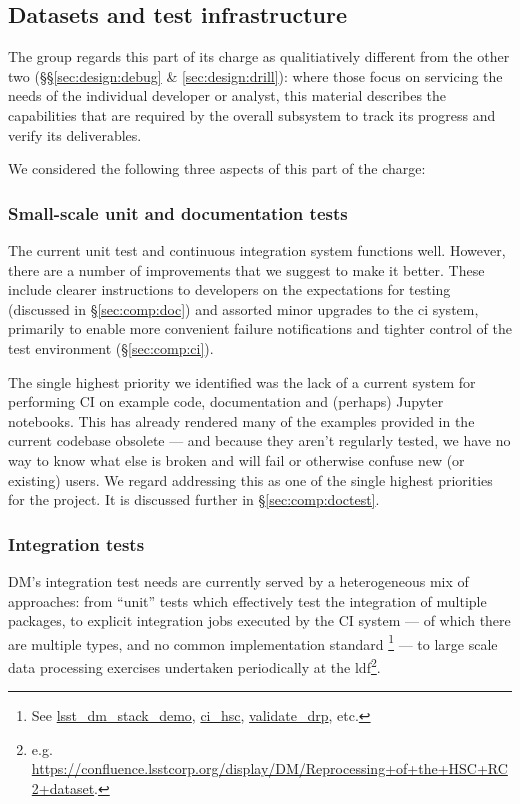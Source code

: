 \subsection{Datasets and test infrastructure}
\label{sec:design:test}

The group regards this part of its charge as qualitiatively different from the
other two (\S\S\ref{sec:design:debug} \& \ref{sec:design:drill}): where those
focus on servicing the needs of the individual developer or analyst, this
material describes the capabilities that are required by the overall subsystem
to track its progress and verify its deliverables.

We considered the following three aspects of this part of the charge:

\subsubsection{Small-scale unit and documentation tests}

The current unit test and continuous integration system functions well.
However, there are a number of improvements that we suggest to make it better.
These include clearer instructions to developers on the expectations for
testing (discussed in \S\ref{sec:comp:doc}) and assorted minor upgrades to the
\gls{ci} system, primarily to enable more convenient failure notifications and
tighter control of the test environment (\S\ref{sec:comp:ci}).

The single highest priority we identified was the lack of a current system for
performing CI on example code, documentation and (perhaps) Jupyter notebooks.
This has already rendered many of the examples provided in the current
codebase obsolete --- and because they aren't regularly tested, we have no way
to know what else is broken and will fail or otherwise confuse new (or
existing) users. We regard addressing this as one of the single highest
priorities for the project. It is discussed further in
\S\ref{sec:comp:doctest}.

\subsubsection{Integration tests}
\label{sec:design:test:integration}

DM's integration test needs are currently served by a heterogeneous mix of
approaches: from ``unit'' tests which effectively test the integration of
multiple packages, to explicit integration jobs executed by the CI
system --- of which there are multiple types, and no common
implementation standard \footnote{See
\href{https://github.com/lsst/lsst_dm_stack_demo}{lsst\_dm\_stack\_demo},
\href{https://github.com/lsst/ci_hsc}{ci\_hsc},
\href{https://github.com/lsst/validate_drp}{validate\_drp}, etc.} --- to large
scale data processing exercises undertaken periodically at the
\gls{ldf}\footnote{e.g.
\url{https://confluence.lsstcorp.org/display/DM/Reprocessing+of+the+HSC+RC2+dataset}.}.

